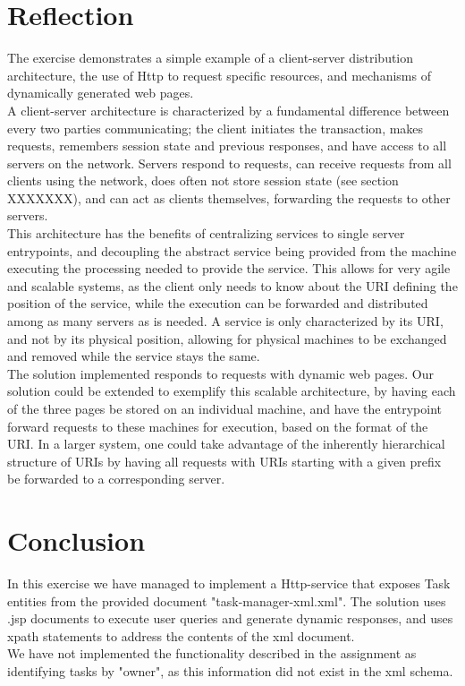 	\section{Reflection}
	\label{servlet_reflection}
		The exercise demonstrates a simple example of a client-server distribution architecture, the use of Http to request specific resources, and mechanisms of dynamically generated web pages.\\
		A client-server architecture is characterized by a fundamental difference between every two parties communicating; the client initiates the transaction, makes requests, remembers session state and previous responses, and have access to all servers on the network. Servers respond to requests, can receive requests from all clients using the network, does often not store session state (see section XXXXXXX), and can act as clients themselves, forwarding the requests to other servers.\\
		This architecture has the benefits of centralizing services to single server entrypoints, and decoupling the abstract service being provided from the machine executing the processing needed to provide the service. This allows for very agile and scalable systems, as the client only needs to know about the URI defining the position of the service, while the execution can be forwarded and distributed among as many servers as is needed. A service is only characterized by its URI, and not by its physical position, allowing for physical machines to be exchanged and removed while the service stays the same. \\
		The solution implemented responds to requests with dynamic web pages. Our solution could be extended to exemplify this scalable architecture, by having each of the three pages be stored on an individual machine, and have the entrypoint forward requests to these machines for execution, based on the format of the URI. In a larger system, one could take advantage of the inherently hierarchical structure of URIs by having all requests with URIs starting with a given prefix be forwarded to a corresponding server.
	\section{Conclusion}
	\label{servlet_conclusion}
		In this exercise we have managed to implement a Http-service that exposes Task entities from the provided document "task-manager-xml.xml". The solution uses .jsp documents to execute user queries and generate dynamic responses, and uses xpath statements to address the contents of the xml document. \\
		We have not implemented the functionality described in the assignment as identifying tasks by "owner", as this information did not exist in the xml schema.